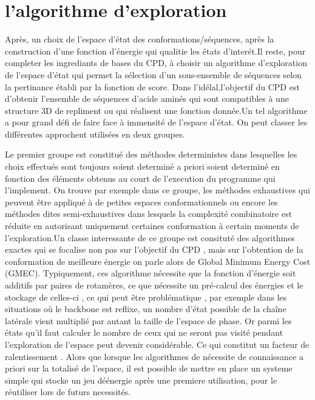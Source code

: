 \section{l'algorithme d'exploration}

Après, un choix de l'espace d'état des conformations/séquences, après la construction d'une fonction d'énergie qui qualitie les états d'interét.Il reste, pour completer les ingrediants de bases du CPD, à choisir un algorithme d'exploration de l'espace d'état qui permet la sélection d'un sous-ensemble de séquences selon la pertinance établi par la fonction de score. Dans l'idélal,l'objectif du CPD est d'obtenir l'ensemble de séquences d'acide aminés qui sont compatibles à une structure 3D de repliment ou qui réalisent une fonction donnée.Un tel algorithme a pour grand défi de faire face à immensité de l'espace d'état. On peut classer les différentes approchent utilisées en deux groupes.

\begin{enumeration}
  Le premier groupe est constitué des méthodes deterministes dans lesquelles les choix effectués sont toujours soient determiné  a priori soient determiné en fonction des éléments obtenus au court de l'execution du programme qui l'implement. On trouve par exemple dans ce groupe, les méthodes exhaustives qui peuvent être appliqué à de petites espaces conformationnels ou encore les méthodes dites semi-exhaustives dans lesquels la complexité combinatoire est réduite en autorisant uniquement  certaines conformation à certain moments de l'exploration.Un classe interessante de ce groupe est consituté des algorithmes exactes qui se focalise non pas sur l'objectif du  CPD , mais sur l'obtention  de la conformation  de meilleure  énergie on parle alors de \og Global Minimum Energy Cost \fg (GMEC).
Typiquement, ces algorithme nécessite que la fonction d'énergie soit  additifs par paires de rotamères, ce que nécessite un pré-calcul des énergies et le stockage de celles-ci , ce qui peut être problématique , par exemple dans les situations où le backbone est reflixe, un nombre d'état possible de la chaîne latérale vient multiplié par autant la taille de l'espace de phase. Or parmi les états qu'il faut calculer le nombre de ceux qui ne seront pas visité pendant l'exploration de l'espace peut devenir considérable. Ce qui constitut un facteur de ralentissement . Alors que lorsque les algorithmes de nécessite de connaissance a priori sur la totalisé de l'espace, il est possible de mettre en place un systeme simple qui stocke un jeu déénergie après une premiere utilisation, pour le réutiliser lors de futurs necessités. 
  
\end{enumeration}

